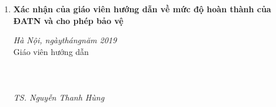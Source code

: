 \documentclass[12pt]{report}
\begin{document}
\begin{enumerate}
Các kết quả nêu trong ĐATN là trung thực, không phải là sao chép toàn văn của bất kỳ công trình nào khác.\\
\begin{adjustwidth}{200pt}{}
\begin{center}
\textit{Hà Nội, ngày\qquad tháng\qquad năm 2019}\\
Tác giả ĐATN \\
\leavevmode\\
\leavevmode\\
\leavevmode\\
\textit{Lê Thị Khanh}
\end{center}
\end{adjustwidth} 
\pagebreak
\item \textbf{Xác nhận của giáo viên hướng dẫn về mức độ hoàn thành của ĐATN và cho phép bảo vệ }\\
\begin{adjustwidth}{200pt}{}
\begin{center}
\textit{Hà Nội, ngày\qquad tháng\qquad năm 2019}\\
Giáo viên hướng dẫn\\ 
\leavevmode\\
\leavevmode\\
\leavevmode\\
\textit{TS. Nguyễn Thanh Hùng}
\end{center}
\end{adjustwidth} 
\end{enumerate}
\end{document}
